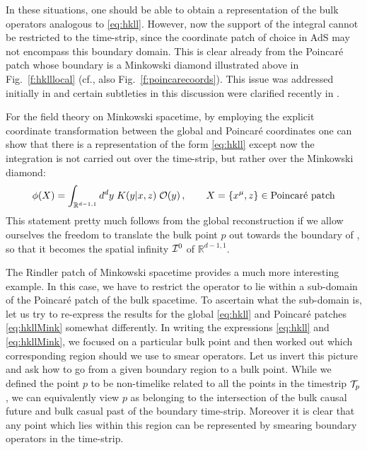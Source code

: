 \documentclass[12pt,openany]{book}
\begin{document}
In these situations, one should be able to obtain a representation of the bulk operators analogous to
\eqref{eq:hkll}. However, now the support of the integral cannot be restricted to the time-strip, since the coordinate patch of choice in AdS may not encompass this boundary domain. This is clear already from the Poincar\'e patch whose boundary is a Minkowski diamond illustrated above in Fig.~\ref{f:hklllocal} (cf., also Fig.~\ref{f:poincarecoords}). This issue was  addressed initially in \cite{Hamilton:2005ju} and certain subtleties in this discussion were clarified recently in \cite{Morrison:2014jha}.

For the field theory on Minkowski spacetime, by employing the explicit coordinate transformation between the global and Poincar\'e coordinates one can show that there is a representation of the form \eqref{eq:hkll} except now the integration is not carried out over the time-strip, but rather over the Minkowski diamond:
%
\begin{equation}
\phi(X) = \int_{{\mathbb R}^{d-1,1}} d^dy \; K(y|x,z)\; {\cal O}(y) \,, \qquad X = \{x^\mu,z\} \in \text{Poincar\'e patch}
\label{eq:hkllMink}
\end{equation}
%
 This statement pretty much follows from the global reconstruction if we allow ourselves the freedom to translate the bulk point $p$ out towards the boundary of , so that it becomes the spatial infinity ${\cal I}^0$ of ${\mathbb R}^{d-1,1}$.

The Rindler patch of Minkowski spacetime provides a much more interesting example. In this case, we have to restrict the operator to lie within a sub-domain of the Poincar\'e patch of the bulk spacetime. To ascertain what the sub-domain is, let us try to re-express the results for the global \eqref{eq:hkll} and Poincar\'e patches  \eqref{eq:hkllMink} somewhat differently. In writing the expressions \eqref{eq:hkll} and \eqref{eq:hkllMink}, we focused on a particular bulk point and then worked out which corresponding region should we use to smear operators. Let us invert this picture and ask how to go from a given boundary region to a bulk point. While we defined the  point $p$ to be non-timelike related to all the points in the timestrip ${\cal T}_p$, we can equivalently view $p$ as belonging to the intersection of the bulk causal future and bulk casual past of the boundary time-strip. Moreover it is clear that any point which lies within this region can be represented by smearing boundary operators in the time-strip.
\end{document}
